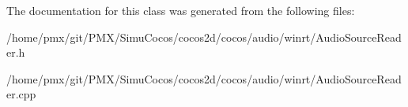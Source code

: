 The documentation for this class was generated from the following files\+:\begin{DoxyCompactItemize}
\item 
/home/pmx/git/\+P\+M\+X/\+Simu\+Cocos/cocos2d/cocos/audio/winrt/Audio\+Source\+Reader.\+h\item 
/home/pmx/git/\+P\+M\+X/\+Simu\+Cocos/cocos2d/cocos/audio/winrt/Audio\+Source\+Reader.\+cpp\end{DoxyCompactItemize}
